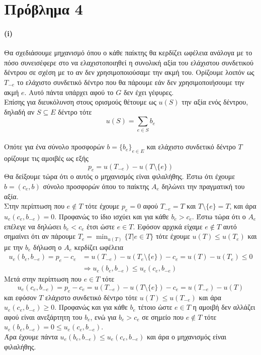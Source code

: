 \documentclass[a4paper,11pt]{article}
\begin{document}
\pagebreak


\section*{Πρόβλημα 4}

\paragraph{(i)}
Θα σχεδιάσουμε μηχανισμό όπου ο κάθε παίκτης θα κερδίζει ωφέλεια ανάλογα με το πόσο συνεισέφερε στο να ελαχιστοποιηθεί η συνολική αξία του ελάχιστου συνδετικού δέντρου σε σχέση με το αν δεν χρησιμοποιούσαμε την ακμή του.
Ορίζουμε λοιπόν ως $T_{-e}$ το ελάχιστο συνδετικό δέντρο που θα πάρουμε εάν δεν χρησιμοποιήσουμε την ακμή $e$.
Αυτό πάντα υπάρχει αφού το $G$ δεν έχει γέφυρες.
\\[8pt]
Επίσης για διευκόλυνση στους ορισμούς θέτουμε ως $u(S)$ την αξία ενός δέντρου, δηλαδή αν $S \subseteq E$ δέντρο τότε
\[u(S) = \sum_{e \in S} b_e\]
\\[8pt]
Οπότε για ένα σύνολο προσφορών $b=\{b_e\}_{e\in E}$ και ελάχιστο συνδετικό δέντρο $T$ ορίζουμε τις αμοιβές ως εξής
\[p_e = u(T_{-e}) - u(T \setminus \{e\})\]
Θα δείξουμε τώρα ότι ο αυτός ο μηχανισμός είναι φιλαλήθης.
Έστω ότι έχουμε $b=(c_e,b)$ σύνολο προσφορών όπου το παίκτης $A_e$ δηλώνει την πραγματική του αξία.
\\[8pt]
Στην περίπτωση που $e \notin T$ τότε έχουμε $p_e = 0$ αφού $T_{-e}=T$ και $T \setminus \{e\} = T$, και άρα $u_e(c_e,b_{-e}) = 0$.
Προφανώς το ίδιο ισχύει και για κάθε $b_e>c_e$.
Έστω τώρα ότι ο $A_e$ επέλεγε να δηλώσει $b_e<c_e$ έτσι ώστε $e\in T$.
Εφόσον αρχικά είχαμε $e \notin T$ αυτό σημαίνει ότι αν πάρουμε $T_e = \min_{u(T)}\{T|e\in T\}$ τότε έχουμε $u(T) \leq u(T_e)$ και με την $b_e$ δήλωση ο $A_e$ κερδίζει ωφέλεια
\begin{align*}
	u_e(b_e,b_{-e}) = p_e - c_e &= u(T_{-e}) - u(T_e \setminus\{e\}) -c_e = u(T) - u(T_e) \leq 0\\
		&\Rightarrow u_e(b_e,b_{-e}) \leq u_e(c_e,b_{-e})
\end{align*}
Μετά στην περίπτωση που $e\in T$ τότε
\[u_e(c_e,b_{-e}) = p_e - c_e = u(T_{-e}) - u(T\setminus \{e\}) - c_e = u(T_{-e}) - u(T)\]
και εφόσον $T$ ελάχιστο συνδετικό δέντρο τότε $u(T) \leq u(T_{-e})$ και άρα $u_e(c_e,b_{-e}) \geq 0$.
Προφανώς και για κάθε $b_e$ τέτοιο ώστε $e \in T$ η αμοιβή δεν αλλάζει αφού είναι ανεξάρτητη του $b_e$, ενώ για $b_e > c_e$ σε σημείο που $e \notin T$ τότε $u_e(b_e,b_{-e}) = 0 \leq u_e(c_e,b_{-e})$.
\\[8pt]
Άρα έχουμε πάντα $u_e(b_e,b_{-e}) \leq u_e(c_e,b_{-e})$ και άρα ο μηχανισμός είναι φιλαλήθης.
\end{document}
